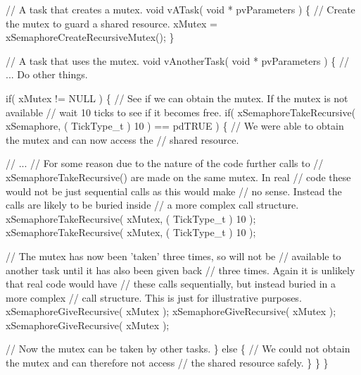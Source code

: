 \begin{DoxyPre}// A task that creates a mutex.
void vATask( void * pvParameters )
\{
   // Create the mutex to guard a shared resource.
   xMutex = xSemaphoreCreateRecursiveMutex();
\}\end{DoxyPre}



\begin{DoxyPre}// A task that uses the mutex.
void vAnotherTask( void * pvParameters )
\{
   // ... Do other things.\end{DoxyPre}



\begin{DoxyPre}   if( xMutex != NULL )
   \{
       // See if we can obtain the mutex.  If the mutex is not available
       // wait 10 ticks to see if it becomes free.
       if( xSemaphoreTakeRecursive( xSemaphore, ( TickType\_t ) 10 ) == pdTRUE )
       \{
           // We were able to obtain the mutex and can now access the
           // shared resource.\end{DoxyPre}



\begin{DoxyPre}           // ...
           // For some reason due to the nature of the code further calls to
           // xSemaphoreTakeRecursive() are made on the same mutex.  In real
           // code these would not be just sequential calls as this would make
           // no sense.  Instead the calls are likely to be buried inside
           // a more complex call structure.
           xSemaphoreTakeRecursive( xMutex, ( TickType\_t ) 10 );
           xSemaphoreTakeRecursive( xMutex, ( TickType\_t ) 10 );\end{DoxyPre}



\begin{DoxyPre}           // The mutex has now been 'taken' three times, so will not be
           // available to another task until it has also been given back
           // three times.  Again it is unlikely that real code would have
           // these calls sequentially, but instead buried in a more complex
           // call structure.  This is just for illustrative purposes.
           xSemaphoreGiveRecursive( xMutex );
           xSemaphoreGiveRecursive( xMutex );
           xSemaphoreGiveRecursive( xMutex );\end{DoxyPre}



\begin{DoxyPre}           // Now the mutex can be taken by other tasks.
       \}
       else
       \{
           // We could not obtain the mutex and can therefore not access
           // the shared resource safely.
       \}
   \}
\}
\end{DoxyPre}
 